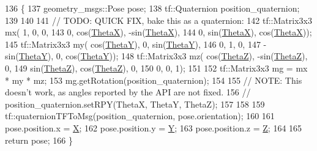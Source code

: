 \begin{DoxyCode}
136 \{
137     geometry\_msgs::Pose pose;
138     tf::Quaternion position\_quaternion;
139 
140     
141     \textcolor{comment}{// TODO: QUICK FIX, bake this as a quaternion:}
142     tf::Matrix3x3 mx(           1,            0,            0, 
143                                 0,  cos(\hyperlink{structCartesianInfo_a39135e53155aa4025c40eeefbfd3b17c}{ThetaX}), -sin(\hyperlink{structCartesianInfo_a39135e53155aa4025c40eeefbfd3b17c}{ThetaX}),
144                                 0,  sin(\hyperlink{structCartesianInfo_a39135e53155aa4025c40eeefbfd3b17c}{ThetaX}),  cos(\hyperlink{structCartesianInfo_a39135e53155aa4025c40eeefbfd3b17c}{ThetaX}));
145     tf::Matrix3x3 my( cos(\hyperlink{structCartesianInfo_a4aef5897f4cdcf7ecc9df6804f844d46}{ThetaY}),            0,  sin(\hyperlink{structCartesianInfo_a4aef5897f4cdcf7ecc9df6804f844d46}{ThetaY}),
146                                 0,            1,            0,
147                      -sin(\hyperlink{structCartesianInfo_a4aef5897f4cdcf7ecc9df6804f844d46}{ThetaY}),            0,  cos(\hyperlink{structCartesianInfo_a4aef5897f4cdcf7ecc9df6804f844d46}{ThetaY}));
148     tf::Matrix3x3 mz( cos(\hyperlink{structCartesianInfo_a2890c501f3b7b9479e12ad51f04f0a7f}{ThetaZ}), -sin(\hyperlink{structCartesianInfo_a2890c501f3b7b9479e12ad51f04f0a7f}{ThetaZ}),            0,
149                       sin(\hyperlink{structCartesianInfo_a2890c501f3b7b9479e12ad51f04f0a7f}{ThetaZ}),  cos(\hyperlink{structCartesianInfo_a2890c501f3b7b9479e12ad51f04f0a7f}{ThetaZ}),            0,
150                                 0,            0,            1);
151 
152     tf::Matrix3x3  mg = mx * my * mz;
153     mg.getRotation(position\_quaternion);
154 
155     \textcolor{comment}{// NOTE: This doesn't work, as angles reported by the API are not fixed.}
156     \textcolor{comment}{// position\_quaternion.setRPY(ThetaX, ThetaY, ThetaZ);}
157 
158     
159     tf::quaternionTFToMsg(position\_quaternion, pose.orientation);
160 
161     pose.position.x = \hyperlink{structCartesianInfo_a212cc2dcae1697132fc31fa2f5d17269}{X};
162     pose.position.y = \hyperlink{structCartesianInfo_a12c2611c89445419b336e58815d87c7c}{Y};
163     pose.position.z = \hyperlink{structCartesianInfo_a14e196e4cb38c0ae7f4658b9b070b7fe}{Z};
164 
165     \textcolor{keywordflow}{return} pose;
166 \}
\end{DoxyCode}
